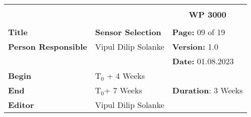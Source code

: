 \begin{table}[!h]
  \begin{center}
    \begin{tabular}{|p{35mm}||p{55mm}|p{50mm}||p{40mm}|}
      \hline
      \multicolumn{3}{|l||}{\textbf{}} & \multicolumn{1}{c|}{}                                                                                                                                                \\
      \multicolumn{3}{|l||}{\textbf{}} & \multicolumn{1}{c|}{\textbf{WP 3000}}                                                                                                                                \\
      \multicolumn{3}{|l||}{\textbf{}} & \multicolumn{1}{c|}{}                                                                                                                                                \\
      \hline\hline
      \textbf{Title}                   & \multicolumn{2}{p{7cm}||}{\textbf{Sensor Selection}}
                                       & \textbf{Page:} 09 of 19                                                                                                                                             \\
      \hline
      \textbf{Person Responsible}        & \multicolumn{2}{l||}{Vipul Dilip Solanke}                                                                                                   & \textbf{Version:} 1.0   \\
      \hline
      \multicolumn{3}{|l||}{}          & \textbf{Date:} 01.08.2023                                                                                                                                          \\
      \hline\hline
      \textbf{Begin}                  & \multicolumn{2}{l||}{T$_0$ + 4 Weeks}                                                                                                                &                         \\
      \hline
      \textbf{End}                    & \multicolumn{2}{l||}{T$_0$+ 7 Weeks}                                                                                                        & \textbf{Duration}: 3 Weeks \\
      \hline\hline
      \textbf{Editor}              & \multicolumn{3}{l|}{Vipul Dilip Solanke}                                                                                                                              \\

\end{tabular}
\end{center}
\end{table}
